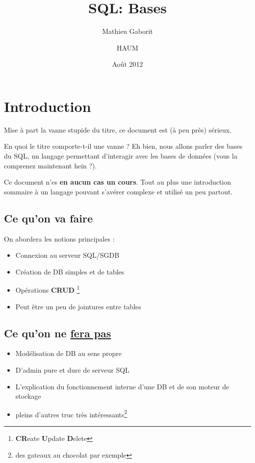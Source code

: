 \documentclass[a4paper, 11pt]{report}
\title{SQL: Bases}
\author{Mathieu Gaborit \and HAUM}
\date{Août 2012}
\begin{document}
    \pagestyle{fancy}
    \maketitle

    \tableofcontents\newpage

    \section*{Introduction}

Mise à part la vanne stupide du titre, ce document est (à peu près) sérieux.

En quoi le titre comporte-t-il une vanne ? Eh bien, nous allons parler des bases du SQL, un langage permettant d'interagir avec les bases de données (vous la comprenez maintenant hein ?).

Ce document n'es {\bf en aucun cas un cours}.
Tout au plus une introduction sommaire à un langage pouvant s'avérer complexe et utilisé un peu partout.

\subsection*{Ce qu'on va faire}

On abordera les notions principales :

\begin{itemize}
    \item Connexion au serveur SQL/SGDB
    \item Création de DB simples et de tables
    \item Opérations {\bfseries CRUD} \footnote{{\bfseries CR}eate {\bfseries U}pdate {\bfseries D}elete}
    \item Peut être un peu de jointures entre tables
\end{itemize}

\subsection*{Ce qu'on ne \underline{fera pas}}

\begin{itemize}
    \item Modélisation de DB au sens propre
    \item D'admin pure et dure de serveur SQL
    \item L'explication du fonctionnement interne d'une DB et de son moteur de stockage
    \item pleins d'autres truc très intéressants\footnote{des gateaux au chocolat par exemple}
\end{itemize}
\end{document}
